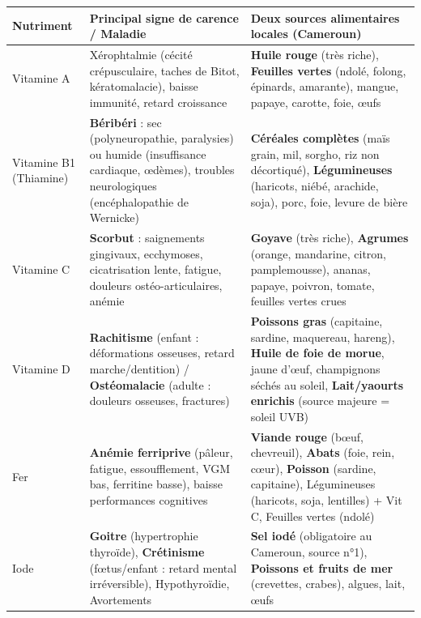 \documentclass[11pt]{article}
\begin{document}
\begin{corrige}
\begin{center}
\begin{tabularx}{\linewidth}{|l|X|X|}\hline
\rowcolor{popblueL}
\textbf{Nutriment} & \textbf{Principal signe de carence / Maladie} & \textbf{Deux sources alimentaires locales (Cameroun)} \\ \hline
Vitamine A & Xérophtalmie (cécité crépusculaire, taches de Bitot, kératomalacie), baisse immunité, retard croissance & \textbf{Huile rouge} (très riche), \textbf{Feuilles vertes} (ndolé, folong, épinards, amarante), mangue, papaye, carotte, foie, œufs \\ \hline
Vitamine B1 (Thiamine) & \textbf{Béribéri} : sec (polyneuropathie, paralysies) ou humide (insuffisance cardiaque, œdèmes), troubles neurologiques (encéphalopathie de Wernicke) & \textbf{Céréales complètes} (maïs grain, mil, sorgho, riz non décortiqué), \textbf{Légumineuses} (haricots, niébé, arachide, soja), porc, foie, levure de bière \\ \hline
Vitamine C & \textbf{Scorbut} : saignements gingivaux, ecchymoses, cicatrisation lente, fatigue, douleurs ostéo-articulaires, anémie & \textbf{Goyave} (très riche), \textbf{Agrumes} (orange, mandarine, citron, pamplemousse), ananas, papaye, poivron, tomate, feuilles vertes crues \\ \hline
Vitamine D & \textbf{Rachitisme} (enfant : déformations osseuses, retard marche/dentition) / \textbf{Ostéomalacie} (adulte : douleurs osseuses, fractures) & \textbf{Poissons gras} (capitaine, sardine, maquereau, hareng), \textbf{Huile de foie de morue}, jaune d'œuf, champignons séchés au soleil, \textbf{Lait/yaourts enrichis} (source majeure = soleil UVB) \\ \hline
Fer & \textbf{Anémie ferriprive} (pâleur, fatigue, essoufflement, VGM bas, ferritine basse), baisse performances cognitives & \textbf{Viande rouge} (bœuf, chevreuil), \textbf{Abats} (foie, rein, cœur), \textbf{Poisson} (sardine, capitaine), Légumineuses (haricots, soja, lentilles) + Vit C, Feuilles vertes (ndolé) \\ \hline
Iode & \textbf{Goitre} (hypertrophie thyroïde), \textbf{Crétinisme} (fœtus/enfant : retard mental irréversible), Hypothyroïdie, Avortements & \textbf{Sel iodé} (obligatoire au Cameroun, source n°1), \textbf{Poissons et fruits de mer} (crevettes, crabes), algues, lait, œufs \\ \hline
\end{tabularx}
\end{center}
\end{corrige}
\end{document}
